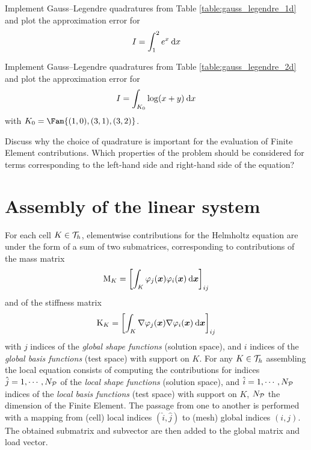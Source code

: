 \documentclass[assignment]{tmanotes}
\begin{document}

\medskip
\begin{tmatsks}
\item Implement Gauss--Legendre quadratures from Table \ref{table:gauss_legendre_1d} and plot the approximation error for
\[
I = \int_1^2 e^x \hspace{.5ex}{\mathrm d} x
\]
\item Implement Gauss--Legendre quadratures from Table \ref{table:gauss_legendre_2d} and plot the approximation error for
\[
I = \int_{K_0} \log(x+y) \hspace{.5ex}{\mathrm d} x
\]
with $K_0 = \Fam{ (1,0), (3,1), (3,2)}$.
\item Discuss why the choice of quadrature is important for the evaluation of Finite Element contributions. Which properties of the problem should be considered for terms corresponding to the left-hand side and right-hand side of the equation?
\end{tmatsks}

\section{Assembly of the linear system}

For each cell $K \in {\mathcal T}_h$, elementwise contributions for the Helmholtz equation are under the form of a sum of two submatrices, corresponding to contributions of the mass matrix
\[
{\mathrm M}_K =  \left[\int_K \varphi_j({{\boldsymbol x}}) \varphi_i({{\boldsymbol x}}) \hspace{.5ex}{\mathrm d}{{\boldsymbol x}}\right]_{i j}
\]
and of the stiffness matrix
\[
{\mathrm K}_K = \left[\int_K \nabla\varphi_j({{\boldsymbol x}}) \nabla\varphi_i({{\boldsymbol x}}) \hspace{.5ex}{\mathrm d}{{\boldsymbol x}}\right]_{ij}
\]
with $j$ indices of the \textit{global shape functions} (solution space), and $i$ indices of the \textit{global basis functions} (test space) with support on $K$.
For any $K\in{\mathcal T}_h$ assembling the local equation consists of computing the contributions for indices $\hat j = 1,\cdots,N_{\mathcal P}$  of the \textit{local shape functions} (solution space), and $\hat i = 1,\cdots,N_{\mathcal P}$ indices of the \textit{local basis functions} (test space) with support on $K$, $N_{\mathcal P}$ the dimension of the Finite Element.
The passage from one to another is performed with a mapping from (cell) local indices $(\hat i, \hat j)$ to (mesh) global indices $(i, j)$.
The obtained submatrix and subvector are then added to the global matrix and load vector.
\end{document}
